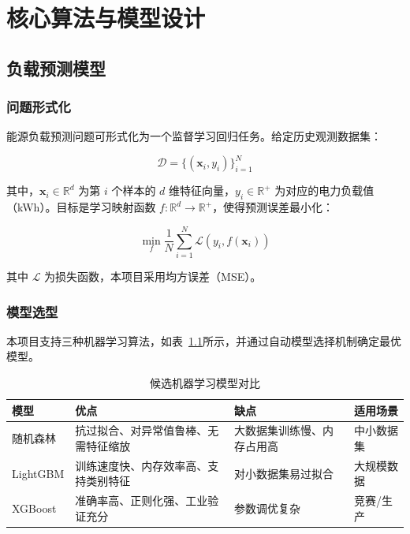 \chapter{核心算法与模型设计}

\section{负载预测模型}

\subsection{问题形式化}

能源负载预测问题可形式化为一个监督学习回归任务。给定历史观测数据集：

\begin{equation}
    \mathcal{D} = \{(\mathbf{x}_i, y_i)\}_{i=1}^{N}
\end{equation}

其中，$\mathbf{x}_i \in \mathbb{R}^d$ 为第 $i$ 个样本的 $d$ 维特征向量，$y_i \in \mathbb{R}^+$ 为对应的电力负载值（kWh）。目标是学习映射函数 $f: \mathbb{R}^d \rightarrow \mathbb{R}^+$，使得预测误差最小化：

\begin{equation}
    \min_{f} \frac{1}{N} \sum_{i=1}^{N} \mathcal{L}(y_i, f(\mathbf{x}_i))
\end{equation}

其中 $\mathcal{L}$ 为损失函数，本项目采用均方误差（MSE）。

\subsection{模型选型}

本项目支持三种机器学习算法，如表~\ref{tab:ml_models}所示，并通过自动模型选择机制确定最优模型。

\begin{table}[htbp]
    \centering
    \caption{候选机器学习模型对比}
    \label{tab:ml_models}
    \begin{tabular}{p{2.5cm}p{4cm}p{4cm}p{2.5cm}}
        \toprule
        \textbf{模型}                   & \textbf{优点} & \textbf{缺点} & \textbf{适用场景} \\
        \midrule
        随机森林\cite{breiman2001random}  &
        抗过拟合、对异常值鲁棒、无需特征缩放            &
        大数据集训练慢、内存占用高                 &
        中小数据集                                                                     \\
        \midrule
        LightGBM\cite{ke2017lightgbm} &
        训练速度快、内存效率高、支持类别特征            &
        对小数据集易过拟合                     &
        大规模数据                                                                     \\
        \midrule
        XGBoost\cite{chen2016xgboost} &
        准确率高、正则化强、工业验证充分              &
        参数调优复杂                        &
        竞赛/生产                                                                     \\
        \bottomrule
    \end{tabular}
\end{table}

